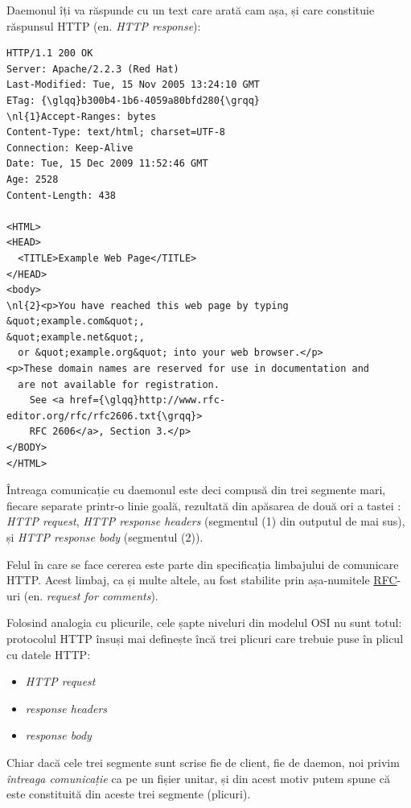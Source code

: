 Daemonul îți va răspunde cu un text care arată cam așa, și care constituie răspunsul
HTTP (en. \textsl{HTTP response}):
\begin{Verbatim}[commandchars=\\\{\}]
HTTP/1.1 200 OK
Server: Apache/2.2.3 (Red Hat)
Last-Modified: Tue, 15 Nov 2005 13:24:10 GMT
ETag: {\glqq}b300b4-1b6-4059a80bfd280{\grqq}            
\nl{1}Accept-Ranges: bytes                        
Content-Type: text/html; charset=UTF-8      
Connection: Keep-Alive                      
Date: Tue, 15 Dec 2009 11:52:46 GMT         
Age: 2528                                   
Content-Length: 438

<HTML>
<HEAD>
  <TITLE>Example Web Page</TITLE>
</HEAD>                          
<body>                           
\nl{2}<p>You have reached this web page by typing &quot;example.com&quot;,
&quot;example.net&quot;,                                            
  or &quot;example.org&quot; into your web browser.</p>             
<p>These domain names are reserved for use in documentation and
  are not available for registration.
	See <a href={\glqq}http://www.rfc-editor.org/rfc/rfc2606.txt{\grqq}>
	RFC 2606</a>, Section 3.</p>        
</BODY>                                                                           
</HTML>
\end{Verbatim}
Întreaga comunicație cu daemonul este deci compusă din trei segmente mari, fiecare separate
printr-o linie goală, rezultată din apăsarea de două ori a tastei :
\textsl{HTTP request}, \textsl{HTTP response headers} (segmentul (1) din outputul de mai sus),
și \textsl{HTTP response body} (segmentul (2)).

Felul în care se face cererea este parte din specificația
limbajului de comunicare HTTP. Acest limbaj, ca și multe altele, au fost stabilite
prin așa-numitele \href{http://en.wikipedia.org/wiki/Request_for_Comments}{RFC}-uri
(en. \textsl{request for comments}).

Folosind analogia cu plicurile, cele șapte niveluri din modelul OSI nu sunt totul:
protocolul HTTP însuși mai definește încă trei plicuri care trebuie puse în
{\glqq}plicul{\grqq} cu datele HTTP:
\begin{itemize}
\item \textsl{HTTP request}
\item \textsl{response headers}
\item \textsl{response body}
\end{itemize}
Chiar dacă cele trei {\glqq}segmente{\grqq} sunt scrise fie de client, fie de daemon,
noi privim \textit{întreaga comunicație} ca pe un fișier unitar, și din acest motiv
putem spune că este constituită din aceste trei segmente ({\glqq}plicuri{\grqq}).

